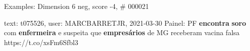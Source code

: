 \begin{frame}{Examples: Dimension 6 neg, score -4, \# 000021}
\footnotesize
\begin{alertblock}{text: t075526, user: MARCBARRETJR, 2021-03-30}
Painel: PF \textbf{encontra} \textbf{soro} com \textbf{enfermeira} e suspeita 
que \textbf{empresários} de MG receberam vacina falsa https://t.co/xsFm6Sfbl3 
\end{alertblock}
\end{frame}

